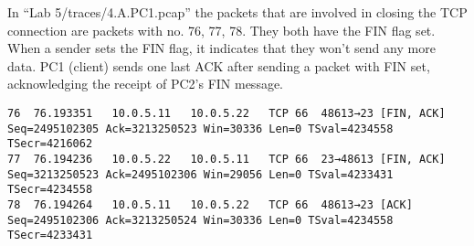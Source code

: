 
In ``Lab 5/traces/4.A.PC1.pcap'' the packets that are involved in closing the TCP connection are packets with no. 76, 77, 78. They both have the FIN flag set. When a sender sets the FIN flag, it indicates that they won't send any more data. PC1 (client) sends one last ACK after sending a packet with FIN set, acknowledging the receipt of PC2's FIN message.

\begin{lstlisting}
76	76.193351	10.0.5.11	10.0.5.22	TCP	66	48613→23 [FIN, ACK] Seq=2495102305 Ack=3213250523 Win=30336 Len=0 TSval=4234558 TSecr=4216062
77	76.194236	10.0.5.22	10.0.5.11	TCP	66	23→48613 [FIN, ACK] Seq=3213250523 Ack=2495102306 Win=29056 Len=0 TSval=4233431 TSecr=4234558
78	76.194264	10.0.5.11	10.0.5.22	TCP	66	48613→23 [ACK] Seq=2495102306 Ack=3213250524 Win=30336 Len=0 TSval=4234558 TSecr=4233431
\end{lstlisting}
